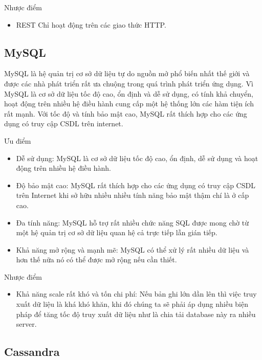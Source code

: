 \begin{itemize}
		    Nhược điểm
		    
	        \begin{itemize}
	            \item REST Chỉ hoạt động trên các giao thức HTTP.
	        \end{itemize}
	 
            \subsection{MySQL}
            
            MySQL là hệ quản trị cơ sở dữ liệu tự do nguồn mở phổ biến nhất thế giới và được các nhà phát triển rất ưa chuộng trong quá trình phát triển ứng dụng. Vì MySQL là cơ sở dữ liệu tốc độ cao, ổn định và dễ sử dụng, có tính khả chuyển, hoạt động trên nhiều hệ điều hành cung cấp một hệ thống lớn các hàm tiện ích rất mạnh. Với tốc độ và tính bảo mật cao, MySQL rất thích hợp cho các ứng dụng có truy cập CSDL trên internet.
            
            Ưu điểm
            
            \begin{itemize}
                \item Dễ sử dụng: MySQL là cơ sở dữ liệu tốc độ cao, ổn định, dễ sử dụng và hoạt động trên nhiều hệ điều hành.
                \item Độ bảo mật cao:  MySQL rất thích hợp cho các ứng dụng có truy cập CSDL trên Internet khi sở hữu nhiều nhiều tính năng bảo mật thậm chí là ở cấp cao.
                \item Đa tính năng: MySQL hỗ trợ rất nhiều chức năng SQL được mong chờ từ một hệ quản trị cơ sở dữ liệu quan hệ cả trực tiếp lẫn gián tiếp.
                \item Khả năng mở rộng và mạnh mẽ: MySQL có thể xử lý rất nhiều dữ liệu và hơn thế nữa nó có thể được mở rộng nếu cần thiết.
            \end{itemize}
            
            Nhược điểm
            
            \begin{itemize}
                \item Khả năng scale rất khó và tốn chi phí: Nếu bản ghi lớn dần lên thì việc truy xuất dữ liệu là khá khó khăn, khi đó chúng ta sẽ phải áp dụng nhiều biện pháp để tăng tốc độ truy xuất dữ liệu như là chia tải database này ra nhiều server.	
            \end{itemize}	
            \subsection{Cassandra}
            

\end{itemize}

